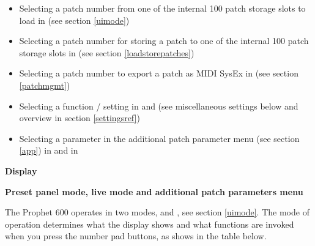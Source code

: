 \documentclass[landscape, 11pt, oneside]{report}
\newenvironment{flowtext}{\addmargin[0cm]{7cm}}{\endaddmargin} %
\begin{document}
\begin{flowtext}
\begin{itemize}
  \item Selecting a patch number from one of the internal 100 patch storage slots to load in \presetpatch  (see section \ref{uimode})
  \item Selecting a patch number for storing a patch to one of the internal 100 patch storage slots in \storagemode (see section \ref{loadstorepatches})
  \item Selecting a patch number to export a patch as MIDI SysEx in \patchmgmt (see section \ref{patchmgmt})
  \item Selecting a function / setting in \shiftmode and \shiftlock (see miscellaneous settings below and overview in section \ref{settingsref})  
  \item Selecting a parameter in the additional patch parameter menu (see section \ref{app}) in \presetpanel and in \livemode
\end{itemize} 

\textbf{Display}



\textbf{Preset panel mode, live mode and additional patch parameters menu}\label{app}

The Prophet 600 operates in two modes, \presetmode and \livemode, see section \ref{uimode}. The mode of operation determines what the display shows and what functions are invoked when you press the number pad buttons, as shows in the table below.

\end{flowtext}
\end{document}
